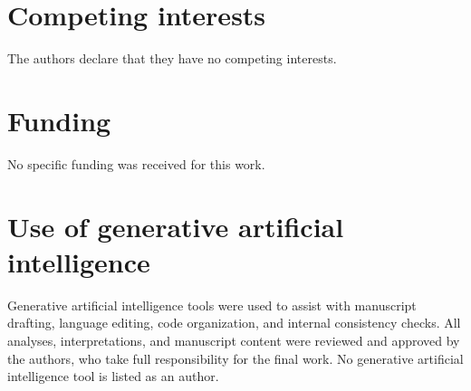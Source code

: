 \section*{Competing interests}

The authors declare that they have no competing interests.

\section*{Funding}

No specific funding was received for this work.

\section*{Use of generative artificial intelligence}

Generative artificial intelligence tools were used to assist with manuscript drafting, language editing, code organization, and internal consistency checks. All analyses, interpretations, and manuscript content were reviewed and approved by the authors, who take full responsibility for the final work. No generative artificial intelligence tool is listed as an author.
